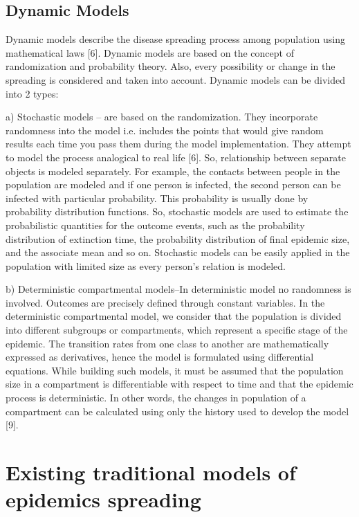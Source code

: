 \subsection{Dynamic Models}

Dynamic models describe the disease spreading process among population using mathematical laws [6]. Dynamic models are based on the concept of randomization and probability theory. Also, every possibility or change in the spreading is considered and taken into account. Dynamic models can be divided into 2 types:

a) Stochastic models – are based on the randomization. They incorporate randomness into the model i.e. includes the points that would give random results each time you pass them during the model implementation. They attempt to model the process analogical to real life [6]. So, relationship between separate objects is modeled separately. For example, the contacts between people in the population are modeled and if one person is infected, the second person can be infected with particular probability. This probability is usually done by probability distribution functions. So, stochastic models are used to estimate the probabilistic quantities for the outcome events, such as the probability distribution of extinction time, the probability distribution of final epidemic size, and the associate mean and so on. Stochastic models can be easily applied in the population with limited size as every person’s relation is modeled.

b) Deterministic compartmental models–In deterministic model no randomness is involved. Outcomes are precisely defined through constant variables. In the deterministic compartmental model, we consider that the population is divided into different subgroups or compartments, which represent a specific stage of the epidemic. The transition rates from one class to another are mathematically expressed as derivatives, hence the model is formulated using differential equations. While building such models, it must be assumed that the population size in a compartment is differentiable with respect to time and that the epidemic process is deterministic. In other words, the changes in population of a compartment can be calculated using only the history used to develop the model [9].

\section{Existing traditional models of epidemics spreading}

